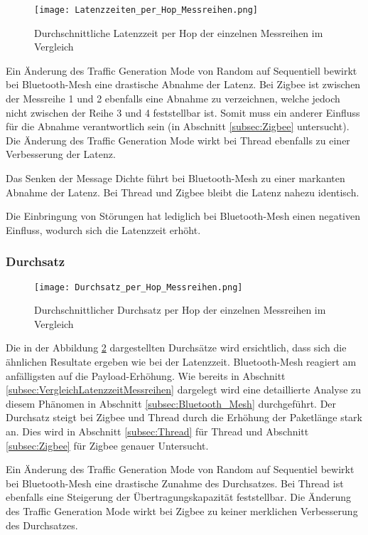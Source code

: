 \begin{figure}[H]
	\centering
	\texttt{[image: Latenzzeiten\_per\_Hop\_Messreihen.png]}
	\caption{Durchschnittliche Latenzzeit per Hop der einzelnen Messreihen im Vergleich}\label{fig:Latenzzeiten_per_Hop_Messreihen}
\end{figure}

Ein Änderung des Traffic Generation Mode von Random auf Sequentiell bewirkt bei Bluetooth-Mesh eine drastische Abnahme der Latenz. Bei Zigbee ist zwischen der Messreihe 1 und 2 ebenfalls eine Abnahme zu verzeichnen, welche jedoch nicht zwischen der Reihe 3 und 4 feststellbar ist. Somit muss ein anderer Einfluss für die Abnahme verantwortlich sein (in Abschnitt \ref{subsec:Zigbee} untersucht). Die Änderung des Traffic Generation Mode wirkt bei Thread ebenfalls zu einer Verbesserung der Latenz.

Das Senken der Message Dichte führt bei Bluetooth-Mesh zu einer markanten Abnahme der Latenz. Bei Thread und Zigbee bleibt die Latenz nahezu identisch.
 
Die Einbringung von Störungen hat lediglich bei Bluetooth-Mesh einen negativen Einfluss, wodurch sich die Latenzzeit erhöht. 

\subsubsection{Durchsatz}\label{subsec:VergleichDurchsatzMessreihen}


\begin{figure}[H]
	\centering
	\texttt{[image: Durchsatz\_per\_Hop\_Messreihen.png]}
	\caption{Durchschnittlicher Durchsatz per Hop der einzelnen Messreihen im Vergleich}\label{fig:Durchsätze_per_Hop_Messreihen}
\end{figure}


Die in der Abbildung \ref{fig:Durchsätze_per_Hop_Messreihen} dargestellten Durchsätze wird ersichtlich, dass sich die ähnlichen Resultate ergeben wie bei der Latenzzeit. Bluetooth-Mesh reagiert am anfälligsten auf die Payload-Erhöhung. Wie bereits in Abschnitt \ref{subsec:VergleichLatenzzeitMessreihen} dargelegt wird eine detaillierte Analyse zu diesem Phänomen in Abschnitt \ref{subsec:Bluetooth_Mesh} durchgeführt. Der Durchsatz steigt bei Zigbee und Thread durch die Erhöhung der Paketlänge stark an. Dies wird in Abschnitt \ref{subsec:Thread} für Thread und Abschnitt \ref{subsec:Zigbee} für Zigbee genauer Untersucht.

Ein Änderung des Traffic Generation Mode von Random auf Sequentiel bewirkt bei Bluetooth-Mesh eine drastische Zunahme des Durchsatzes. Bei Thread ist ebenfalls eine Steigerung der Übertragungskapazität feststellbar. Die Änderung des Traffic Generation Mode wirkt bei Zigbee zu keiner merklichen Verbesserung des Durchsatzes.

